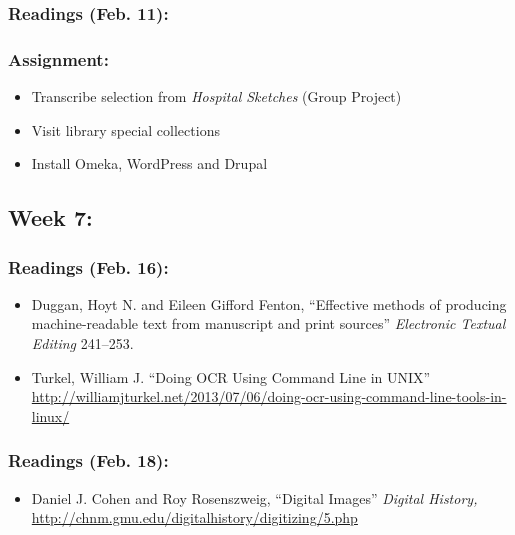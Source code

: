 \documentclass[]{article}
\begin{document}
\subsubsection{Readings (Feb. 11):}\label{readings-feb.-11}

\subsubsection{Assignment:}\label{assignment-4}

\begin{itemize}
\itemsep1pt\parskip0pt
\item
  Transcribe selection from \emph{Hospital Sketches} (Group Project)
\item
  Visit library special collections
\item
  Install Omeka, WordPress and Drupal
\end{itemize}

\subsection{Week 7:}\label{week-7}

\subsubsection{Readings (Feb. 16):}\label{readings-feb.-16}

\begin{itemize}
\itemsep1pt\parskip0pt
\item
  Duggan, Hoyt N. and Eileen Gifford Fenton, ``Effective methods of
  producing machine-readable text from manuscript and print sources''
  \emph{Electronic Textual Editing} 241--253.
\item
  Turkel, William J. ``Doing OCR Using Command Line in UNIX''
  \url{http://williamjturkel.net/2013/07/06/doing-ocr-using-command-line-tools-in-linux/}
\end{itemize}

\subsubsection{Readings (Feb. 18):}\label{readings-feb.-18}

\begin{itemize}
\itemsep1pt\parskip0pt
\item
  Daniel J. Cohen and Roy Rosenszweig, ``Digital Images'' \emph{Digital
  History,} \url{http://chnm.gmu.edu/digitalhistory/digitizing/5.php}
\end{itemize}
\end{document}

